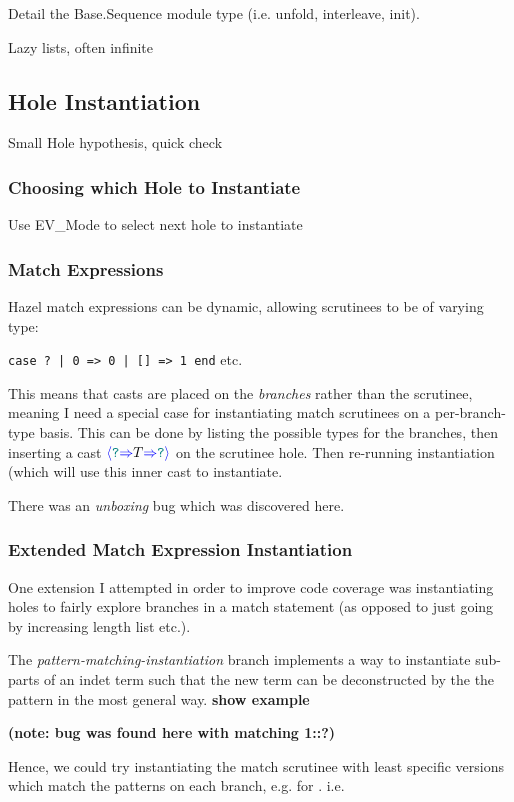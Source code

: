 Detail the Base.Sequence module type (i.e. unfold, interleave, init).

Lazy lists, often infinite
\subsection{Hole Instantiation}\label{sec:HoleInstantiation}
Small Hole hypothesis, quick check


\subsubsection{Choosing which Hole to Instantiate}
Use EV\_Mode to select next hole to instantiate

\subsubsection{Match Expressions}
Hazel match expressions can be dynamic, allowing scrutinees to be of varying type:

\texttt{case ? | 0 => 0 | [] => 1 end} etc.

This means that casts are placed on the \textit{branches} rather than the scrutinee, meaning I need a special case for instantiating match scrutinees on a per-branch-type basis. This can be done by listing the possible types for the branches, then inserting a cast ${\color{blue}\langle} {\color{teal}\texttt{?}} {\color{blue}\Rightarrow} T {\color{blue}\Rightarrow} {\color{teal}\texttt{?}} {\color{blue}\rangle}$ on the scrutinee hole. Then re-running instantiation (which will use this inner cast to instantiate.

There was an \textit{unboxing} bug which was discovered here.

\subsubsection{Extended Match Expression Instantiation}
One extension I attempted in order to improve code coverage was instantiating holes to fairly explore branches in a match statement (as opposed to just going by increasing length list etc.). 

The \textit{pattern-matching-instantiation} branch implements a way to instantiate sub-parts of an indet term such that the new term can be deconstructed by the the pattern in the most general way. \textbf{show example}

\textbf{(note: bug was found here with matching 1::?)}

Hence, we could try instantiating the match scrutinee with least specific versions which match the patterns on each branch, e.g.  for . i.e. 


